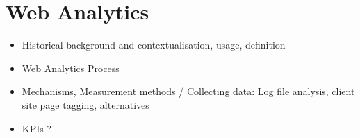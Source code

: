 







\section{Web Analytics}

\begin{itemize}
\item Historical background and contextualisation, usage, definition
\item Web Analytics Process
\item Mechanisms, Measurement methods / Collecting data: Log file analysis, client site page tagging, alternatives
\item KPIs ?
\end{itemize}


















